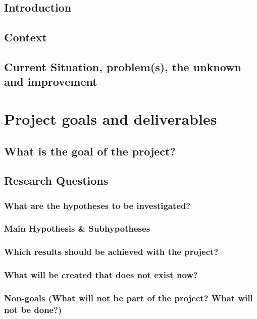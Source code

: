 \documentclass[a4paper,11pt]{article}
\begin{document}
\subsection{Introduction}



\subsection{Context}

\subsection{Current Situation, problem(s), the unknown and improvement}
\section{Project goals and deliverables}
\label{sect:goals}


\subsection{What is the goal of the project?}

\subsection{Research Questions}
\subsubsection{What are the hypotheses to be investigated?}
\subsubsection{Main Hypothesis \& Subhypotheses}

\subsubsection{Which results should be achieved with the project?}
\subsubsection{What will be created that does not exist now?}

\subsubsection{Non-goals (What will not be part of the project? What will not be done?)}
\end{document}
